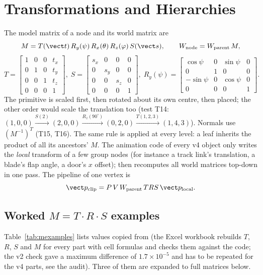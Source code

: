 \section{Transformations and Hierarchies}\label{sec:transform}
The model matrix of a node and its world matrix are
\begin{equation}
  M = T(\vect t)\,R_y(\psi)\,R_x(\theta)\,R_z(\varphi)\,S(\vect s),\qquad
  W_\text{node} = W_\text{parent}\,M ,
\end{equation}
\begin{equation}
  T=\begin{bmatrix}1&0&0&t_x\\0&1&0&t_y\\0&0&1&t_z\\0&0&0&1\end{bmatrix},\;
  S=\begin{bmatrix}s_x&0&0&0\\0&s_y&0&0\\0&0&s_z&0\\0&0&0&1\end{bmatrix},\;
  R_y(\psi)=\begin{bmatrix}\cos\psi&0&\sin\psi&0\\0&1&0&0\\-\sin\psi&0&\cos\psi&0\\0&0&0&1\end{bmatrix}.
\end{equation}
The primitive is scaled first, then rotated about its own centre, then placed; the other order would scale the
translation too (test T14: $(1,0,0)\xrightarrow{S(2)}(2,0,0)\xrightarrow{R_z(90^\circ)}(0,2,0)\xrightarrow{T(1,2,3)}(1,4,3)$).
Normals use $(M^{-1})^T$ (T15, T16). The same rule is applied at every level: a leaf inherits the product of all its
ancestors' $M$. The animation code of every v4 object only writes the \emph{local} transform of a few group nodes
(for instance a track link's translation, a blade's flap angle, a door's $x$ offset); 
then recomputes all world matrices top-down in one pass. The pipeline of one vertex is
\begin{equation}
  \vect p_\text{clip}=P\,V\,W_\text{parent}\,T R S\,\vect p_\text{local}.
\end{equation}

\subsection{Worked $M=T\cdot R\cdot S$ examples}
Table~\ref{tab:mexamples} lists values copied from  (the Excel workbook rebuilds
$T$, $R$, $S$ and $M$ for every part with cell formulas and checks them against the code; the v2 check gave a maximum
difference of $1.7\times10^{-5}$ and has to be repeated for the v4 parts, see the audit). Three of them are expanded
to full matrices below.

